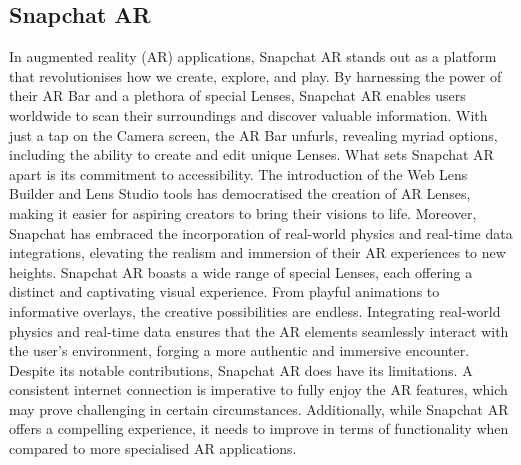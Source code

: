 \subsection*{Snapchat AR}
In augmented reality (AR) applications, Snapchat AR stands out as a platform that revolutionises how we create, explore, and play. By harnessing the power of their AR Bar and a plethora of special Lenses, Snapchat AR enables users worldwide to scan their surroundings and discover valuable information. With just a tap on the Camera screen, the AR Bar unfurls, revealing myriad options, including the ability to create and edit unique Lenses.
What sets Snapchat AR apart is its commitment to accessibility. The introduction of the Web Lens Builder and Lens Studio tools has democratised the creation of AR Lenses, making it easier for aspiring creators to bring their visions to life. Moreover, Snapchat has embraced the incorporation of real-world physics and real-time data integrations, elevating the realism and immersion of their AR experiences to new heights.
Snapchat AR boasts a wide range of special Lenses, each offering a distinct and captivating visual experience. From playful animations to informative overlays, the creative possibilities are endless. Integrating real-world physics and real-time data ensures that the AR elements seamlessly interact with the user's environment, forging a more authentic and immersive encounter.
Despite its notable contributions, Snapchat AR does have its limitations. A consistent internet connection is imperative to fully enjoy the AR features, which may prove challenging in certain circumstances. Additionally, while Snapchat AR offers a compelling experience, it needs to improve in terms of functionality when compared to more specialised AR applications.

